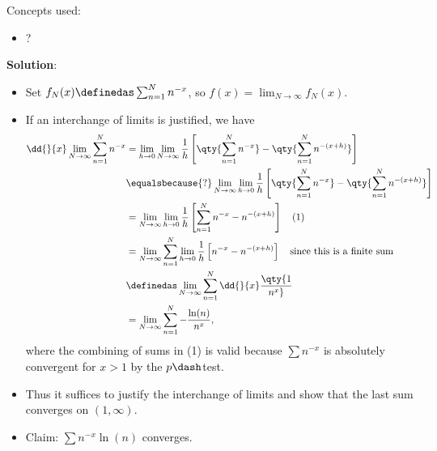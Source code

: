 \begin{solution}

Concepts used:

\begin{itemize}
\tightlist
\item
  ?
\end{itemize}

\textbf{Solution}:

\begin{itemize}
\item
  Set \(f_N(x) \definedas \sum_{n=1}^N n^{-x}\), so
  \(f(x) = \lim_{N\to\infty} f_N(x)\).
\item
  If an interchange of limits is justified, we have
  \begin{align*}  
  \dd{}{x} \lim_{N\to\infty} \sum_{n=1}^N n^{-x}
  &= \lim_{h\to 0} \lim_{N\to\infty} {1\over h} \left[ \qty{\sum_{n=1}^N n^{-x}} - \qty{\sum_{n=1}^N n^{-(x+h)} }\right] \\
  &\equalsbecause{?} \lim_{N\to\infty} \lim_{h\to 0} {1\over h} \left[ \qty{\sum_{n=1}^N n^{-x}} - \qty{\sum_{n=1}^N n^{-(x+h)} }\right] \\
  &= \lim_{N\to\infty} \lim_{h\to 0} {1\over h} \left[ {\sum_{n=1}^N n^{-x}} - {n^{-(x+h)} }\right] \quad\text{(1)} \\
  &= \lim_{N\to\infty} \sum_{n=1}^N \lim_{h\to 0} {1\over h} \left[ n^{-x} - n^{-(x+h)} \right] \quad\text{since this is a finite sum} \\
  &\definedas \lim_{N\to\infty} \sum_{n=1}^N \dd{}{x}\qty{1 \over n^x} \\ 
  &= \lim_{N\to\infty} \sum_{n=1}^N -{\ln(n) \over n^x}
  ,\end{align*} where the combining of sums in (1) is valid because
  \(\sum n^{-x}\) is absolutely convergent for \(x>1\) by the
  \(p\dash\)test.
\item
  Thus it suffices to justify the interchange of limits and show that
  the last sum converges on \((1, \infty)\).
\item
  Claim: \(\sum n^{-x}\ln(n)\) converges.


\end{itemize}
\end{solution}
